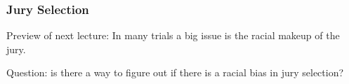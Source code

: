 \documentclass[handout]{beamer}
\newcommand{\blue}[1]{\textcolor{blue2}{#1}}
\begin{document}
%
%
%
%
%
%


\begin{frame}[fragile]
\frametitle{Jury Selection}

Preview of next lecture:  In many trials a big issue is the \blue{racial makeup} of the jury.  

\vspace{0.25cm}

\pause Question: is there a way to figure out if there is a \blue{racial bias} in jury selection?  

\end{frame}
\end{document}
